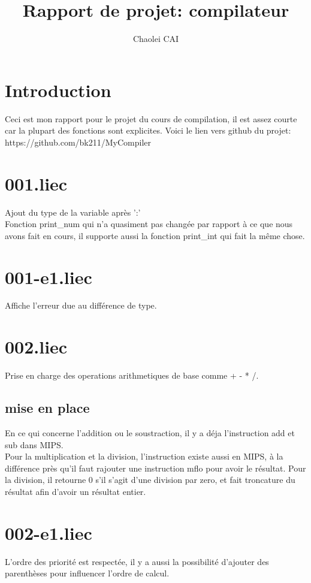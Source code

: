 \documentclass[12pt, letterpaper]{article}
\title{Rapport de projet: compilateur }
\author{Chaolei CAI}
\begin{document}
\begin{titlepage}
    \maketitle
\end{titlepage}

\tableofcontents
\section{Introduction}
Ceci est mon rapport pour le projet du cours de compilation, il est assez courte car la plupart des fonctions sont explicites. 
Voici le lien vers github du projet: \\https://github.com/bk211/MyCompiler

\section{001.liec}
Ajout du type de la variable après ':'\\
Fonction print\_num qui n'a quasiment pas changée par rapport à ce que nous avons 
fait en cours, il supporte aussi la fonction print\_int qui fait la même chose.

\section{001-e1.liec}
Affiche l'erreur due au différence de type.

\section{002.liec}
Prise en charge des operations arithmetiques de base comme + - * /.
\subsection{mise en place}
En ce qui concerne l'addition ou le soustraction, il y a déja l'instruction add et sub dans MIPS.\\
Pour la multiplication et la division, l'instruction existe aussi en MIPS, à la différence près qu'il faut rajouter une instruction 
mflo pour avoir le résultat. Pour la division, il retourne 0 s'il s'agit d'une division par zero, et fait troncature du résultat 
afin d'avoir un résultat entier.

\section{002-e1.liec}
L'ordre des priorité est respectée, il y a aussi la possibilité d'ajouter des parenthèses pour influencer l'ordre de calcul.
\end{document}

